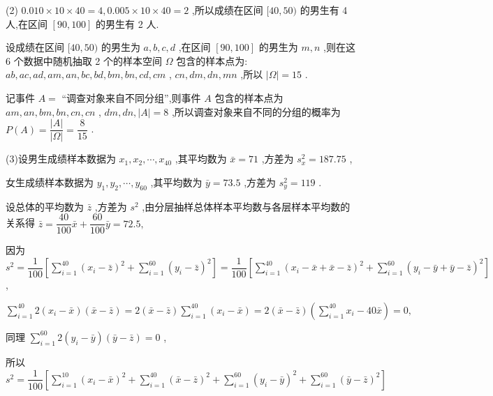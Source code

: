 (2) ${0.010} \times  {10} \times  {40} = 4,{0.005} \times  {10} \times  {40} = 2$ ,所以成绩在区间 $\lbrack {40},{50})$ 的男生有 4 人,在区间 $\left\lbrack  {{90},{100}}\right\rbrack$ 的男生有 2 人.

设成绩在区间 $\lbrack {40},{50})$ 的男生为 $a,b,c,d$ ,在区间 $\left\lbrack  {{90},{100}}\right\rbrack$ 的男生为 $m,n$ ,则在这 6 个数据中随机抽取 2 个的样本空间 $\Omega$ 包含的样本点为: ${ab},{ac},{ad},{am},{an},{bc},{bd},{bm},{bn},{cd},{cm}$ , ${cn},{dm},{dn},{mn}$ ,所以 $\left| \Omega \right|  = {15}$ .

记事件 $A =$ “调查对象来自不同分组”,则事件 $A$ 包含的样本点为 ${am},{an},{bm},{bn},{cn},{cn}$ , ${dm},{dn},\left| A\right|  = 8$ ,所以调查对象来自不同的分组的概率为 $P\left( A\right)  = \dfrac{\left| A\right| }{\left| \Omega \right| } = \dfrac{8}{15}$ .

(3)设男生成绩样本数据为 ${x}_{1},{x}_{2},\cdots ,{x}_{40}$ ,其平均数为 $\bar{x} = {71}$ ,方差为 ${s}_{x}^{2} = {187.75}$ ,

女生成绩样本数据为 ${y}_{1},{y}_{2},\cdots ,{y}_{60}$ ,其平均数为 $\bar{y} = {73.5}$ ,方差为 ${s}_{y}^{2} = {119}$ .

设总体的平均数为 $\bar{z}$ ,方差为 ${s}^{2}$ ,由分层抽样总体样本平均数与各层样本平均数的关系得 $\bar{z} = \dfrac{40}{100}\bar{x} + \dfrac{60}{100}\bar{y} = {72.5},$

因为 ${s}^{2} = \dfrac{1}{100}\left\lbrack  {\mathop{\sum }\limits_{{i = 1}}^{{40}}{\left( {x}_{i} - \bar{z}\right) }^{2} + \mathop{\sum }\limits_{{i = 1}}^{{60}}{\left( {y}_{i} - \bar{z}\right) }^{2}}\right\rbrack   = \dfrac{1}{100}\left\lbrack  {\mathop{\sum }\limits_{{i = 1}}^{{40}}{\left( {x}_{i} - \bar{x} + \bar{x} - \bar{z}\right) }^{2} + \mathop{\sum }\limits_{{i = 1}}^{{60}}{\left( {y}_{i} - \bar{y} + \bar{y} - \bar{z}\right) }^{2}}\right\rbrack$ ,

$\mathop{\sum }\limits_{{i = 1}}^{{40}}2\left( {{x}_{i} - \bar{x}}\right) \left( {\bar{x} - \bar{z}}\right)  = 2\left( {\bar{x} - \bar{z}}\right) \mathop{\sum }\limits_{{i = 1}}^{{40}}\left( {{x}_{i} - \bar{x}}\right)  = 2\left( {\bar{x} - \bar{z}}\right) \left( {\mathop{\sum }\limits_{{i = 1}}^{{40}}{x}_{i} - {40}\bar{x}}\right)  = 0,$

同理 $\mathop{\sum }\limits_{{i = 1}}^{{60}}2\left( {{y}_{i} - \bar{y}}\right) \left( {\bar{y} - \bar{z}}\right)  = 0$ ,

所以 ${s}^{2} = \dfrac{1}{100}\left\lbrack  {\mathop{\sum }\limits_{{i = 1}}^{{10}}{\left( {x}_{i} - \bar{x}\right) }^{2} + \mathop{\sum }\limits_{{i = 1}}^{{40}}{\left( \bar{x} - \bar{z}\right) }^{2} + \mathop{\sum }\limits_{{i = 1}}^{{60}}{\left( {y}_{i} - \bar{y}\right) }^{2} + \mathop{\sum }\limits_{{i = 1}}^{{60}}{\left( \bar{y} - \bar{z}\right) }^{2}}\right\rbrack$


